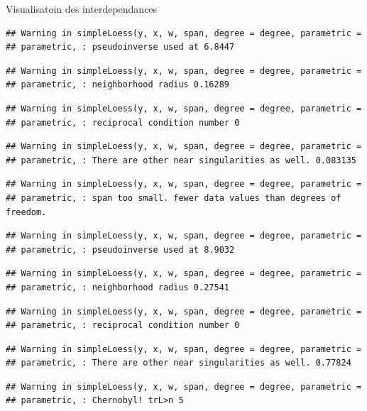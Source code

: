 \documentclass[11pt,ignorenonframetext,]{beamer}
\begin{document}
\begin{frame}[fragile]{Visualisatoin des interdependances}
\begin{verbatim}
## Warning in simpleLoess(y, x, w, span, degree = degree, parametric =
## parametric, : pseudoinverse used at 6.8447
\end{verbatim}

\begin{verbatim}
## Warning in simpleLoess(y, x, w, span, degree = degree, parametric =
## parametric, : neighborhood radius 0.16289
\end{verbatim}

\begin{verbatim}
## Warning in simpleLoess(y, x, w, span, degree = degree, parametric =
## parametric, : reciprocal condition number 0
\end{verbatim}

\begin{verbatim}
## Warning in simpleLoess(y, x, w, span, degree = degree, parametric =
## parametric, : There are other near singularities as well. 0.083135
\end{verbatim}

\begin{verbatim}
## Warning in simpleLoess(y, x, w, span, degree = degree, parametric =
## parametric, : span too small. fewer data values than degrees of freedom.
\end{verbatim}

\begin{verbatim}
## Warning in simpleLoess(y, x, w, span, degree = degree, parametric =
## parametric, : pseudoinverse used at 8.9032
\end{verbatim}

\begin{verbatim}
## Warning in simpleLoess(y, x, w, span, degree = degree, parametric =
## parametric, : neighborhood radius 0.27541
\end{verbatim}

\begin{verbatim}
## Warning in simpleLoess(y, x, w, span, degree = degree, parametric =
## parametric, : reciprocal condition number 0
\end{verbatim}

\begin{verbatim}
## Warning in simpleLoess(y, x, w, span, degree = degree, parametric =
## parametric, : There are other near singularities as well. 0.77824
\end{verbatim}

\begin{verbatim}
## Warning in simpleLoess(y, x, w, span, degree = degree, parametric =
## parametric, : Chernobyl! trL>n 5


\end{verbatim}
\end{frame}
\end{document}
